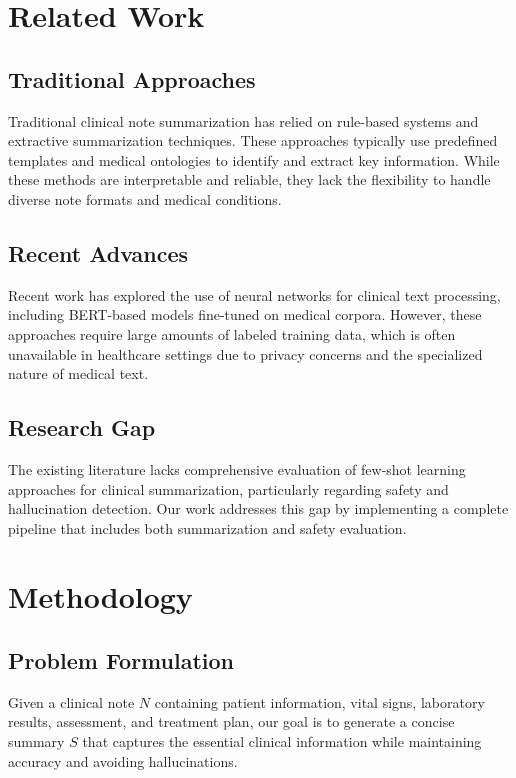 \documentclass[sigconf]{acmart}
\begin{document}
\section{Related Work}

\subsection{Traditional Approaches}

Traditional clinical note summarization has relied on rule-based systems and extractive summarization techniques. These approaches typically use predefined templates and medical ontologies to identify and extract key information. While these methods are interpretable and reliable, they lack the flexibility to handle diverse note formats and medical conditions.

\subsection{Recent Advances}

Recent work has explored the use of neural networks for clinical text processing, including BERT-based models fine-tuned on medical corpora. However, these approaches require large amounts of labeled training data, which is often unavailable in healthcare settings due to privacy concerns and the specialized nature of medical text.

\subsection{Research Gap}

The existing literature lacks comprehensive evaluation of few-shot learning approaches for clinical summarization, particularly regarding safety and hallucination detection. Our work addresses this gap by implementing a complete pipeline that includes both summarization and safety evaluation.

\section{Methodology}

\subsection{Problem Formulation}

Given a clinical note $N$ containing patient information, vital signs, laboratory results, assessment, and treatment plan, our goal is to generate a concise summary $S$ that captures the essential clinical information while maintaining accuracy and avoiding hallucinations.
\end{document}
